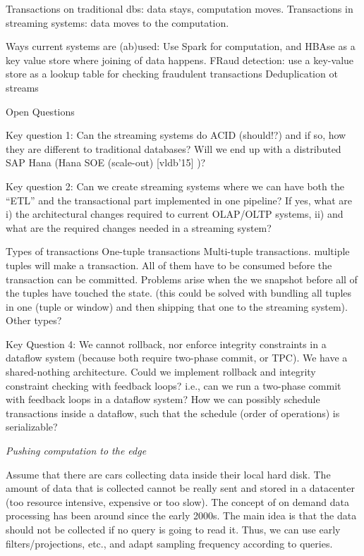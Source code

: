 Transactions on traditional dbs: data stays, computation moves. 
Transactions in streaming systems: data moves to the computation.

Ways current systems are (ab)used:
Use Spark for computation, and HBAse as a key value store where joining of data happens.
FRaud detection: use a key-value store as a lookup table for checking fraudulent transactions
Deduplication ot streams

Open Questions

Key question 1: Can the streaming systems do ACID (should!?) and if so, how they are different to traditional databases? Will we end up with a distributed SAP Hana (Hana SOE (scale-out) [vldb’15] )?

Key question 2: Can we create streaming systems where we can have both the “ETL” and the transactional part implemented in one pipeline? If yes, what are i) the architectural changes required to current OLAP/OLTP systems, ii) and what are the required changes needed in a streaming system?


Types of transactions
One-tuple transactions
Multi-tuple transactions. multiple tuples will make a transaction. All of them have to be consumed before the transaction can be committed. Problems arise when the we snapshot before all of the tuples have touched the state. (this could be solved with bundling all tuples in one (tuple or window) and then shipping that one to the streaming system).
Other types?


Key Question 4: We cannot rollback, nor enforce integrity constraints in a dataflow system (because both require two-phase commit, or TPC). We have a shared-nothing architecture. Could we implement rollback and integrity constraint checking with feedback loops? i.e., can we run a two-phase commit with feedback loops in a dataflow system? How we can possibly schedule transactions inside a dataflow, such that the schedule (order of operations) is serializable?

\emph{Pushing computation to the edge}

Assume that there are cars collecting data inside their local hard disk. The amount of data that is collected cannot be really sent and stored in a datacenter (too resource intensive, expensive or too slow). The concept of on demand data processing has been around since the early 2000s. The main idea is that the data should not be collected if no query is going to read it. Thus, we can use early filters/projections, etc., and adapt sampling frequency according to queries. 

